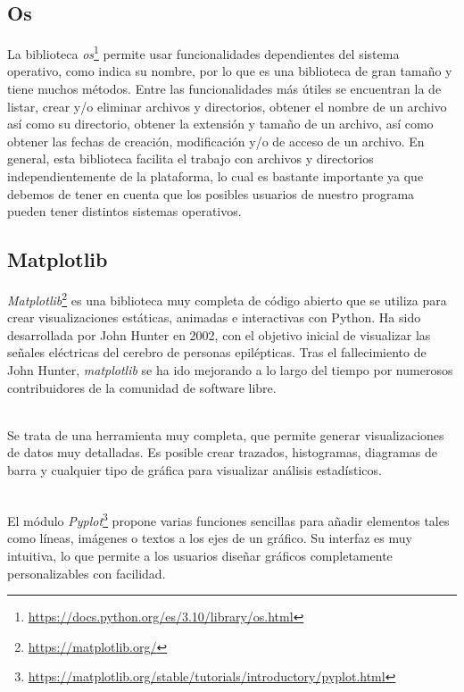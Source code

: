 \documentclass[a4paper, 12pt]{book}
\begin{document}
\subsection{Os}
\label{subsec:os}


La biblioteca \textit{os}\footnote{\url{https://docs.python.org/es/3.10/library/os.html}} permite usar funcionalidades dependientes del sistema operativo, como indica su nombre, por lo que es una biblioteca de gran tamaño y tiene muchos métodos.
Entre las funcionalidades más útiles se encuentran la de listar, crear y/o eliminar archivos y directorios, obtener el nombre de un archivo así como su directorio, obtener la extensión y tamaño de un archivo, así como obtener las fechas de creación, modificación
y/o de acceso de un archivo. En general, esta biblioteca facilita el trabajo con archivos y directorios independientemente de la plataforma, lo cual es bastante importante ya que debemos de tener en cuenta que los posibles usuarios de nuestro programa pueden tener distintos
sistemas operativos.

\subsection{Matplotlib}
\label{subsec:matplotlib}

\textit{Matplotlib}\footnote{\url{https://matplotlib.org/}} es una biblioteca muy completa de código abierto que se utiliza para crear visualizaciones estáticas, animadas e interactivas con Python.
Ha sido desarrollada por John Hunter en 2002, con el objetivo inicial de visualizar las señales eléctricas del cerebro de personas epilépticas.
Tras el fallecimiento de John Hunter, \textit{matplotlib} se ha ido mejorando a lo largo del tiempo por numerosos contribuidores de la comunidad de software libre.

\\Se trata de una herramienta muy completa, que permite generar visualizaciones de datos muy detalladas. Es posible crear trazados, histogramas, diagramas de barra y
cualquier tipo de gráfica para visualizar análisis estadísticos. 

\\El módulo \textit{Pyplot}\footnote{\url{https://matplotlib.org/stable/tutorials/introductory/pyplot.html}} propone varias funciones sencillas para añadir elementos tales como líneas, imágenes o textos
a los ejes de un gráfico. Su interfaz es muy intuitiva, lo que permite a los usuarios diseñar gráficos completamente personalizables con facilidad.
\end{document}
